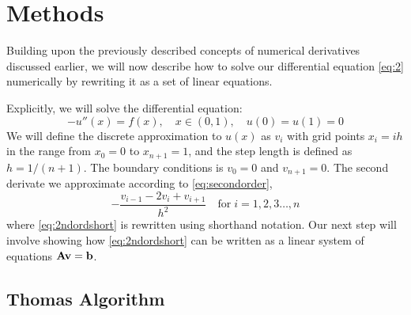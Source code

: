 \section*{Methods} 
Building upon the previously described concepts of numerical derivatives
discussed earlier, we will now describe how to solve our differential
equation \cref{eq:2}  numerically by rewriting it as a set of linear equations.
\par
Explicitly, we will solve the differential equation:
\begin{equation*}
  -u''(x) = f(x), \quad x \in (0,1), \quad u(0)=u(1)=0 
\end{equation*} 
We will define the discrete approximation to $u(x)$ as $v_i$ with grid points
$x_i = ih$ in the range from $x_0 = 0$ to $x_{n +1} = 1$, and the step length is
defined as $h = 1/(n+1)$. The boundary conditions is $v_0 = 0$ and 
$v_{n+1} = 0$. The second derivate we approximate according to
\cref{eq:secondorder},
\begin{equation}\label{eq:2ndordshort}
  -\frac{v_{i-1}-2v_i + v_{i+1}}{h^2} \quad \mathrm{for} \; i = 1,2,3 \dots , n
\end{equation} 
where \cref{eq:2ndordshort} is rewritten using shorthand notation. 
Our next step will involve showing how \cref{eq:2ndordshort} can be written as a
linear system of equations $\mathbf{A} \mathbf{v} = \mathbf{b}$. 

\subsection*{Thomas Algorithm}
